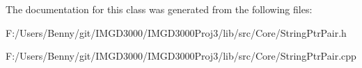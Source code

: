 The documentation for this class was generated from the following files\+:\begin{DoxyCompactItemize}
\item 
F\+:/\+Users/\+Benny/git/\+I\+M\+G\+D3000/\+I\+M\+G\+D3000\+Proj3/lib/src/\+Core/String\+Ptr\+Pair.\+h\item 
F\+:/\+Users/\+Benny/git/\+I\+M\+G\+D3000/\+I\+M\+G\+D3000\+Proj3/lib/src/\+Core/String\+Ptr\+Pair.\+cpp\end{DoxyCompactItemize}

